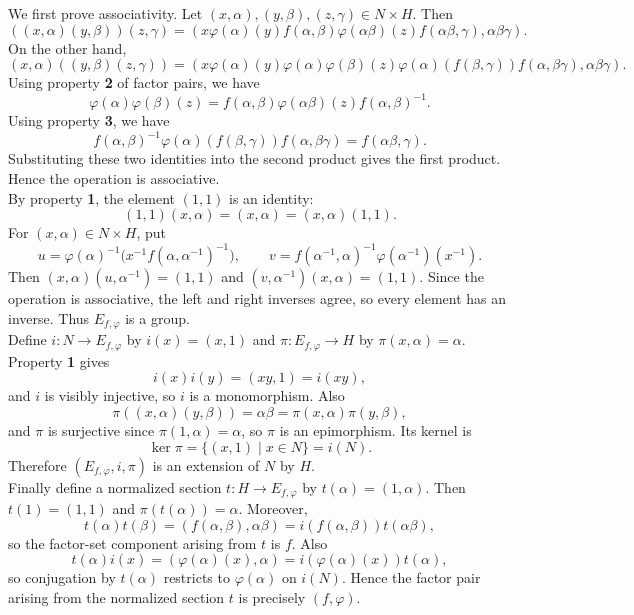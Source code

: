 \documentclass[../Odyssey_Project.tex]{subfiles}
\begin{document}
\begin{solution}
We first prove associativity. Let $(x,\alpha),(y,\beta),(z,\gamma)\in N\times H$. Then
\[
    ((x,\alpha)(y,\beta))(z,\gamma)
    =
    (x\varphi(\alpha)(y)f(\alpha,\beta)\varphi(\alpha\beta)(z)f(\alpha\beta,\gamma),\alpha\beta\gamma).
\]
On the other hand,
\[
    (x,\alpha)((y,\beta)(z,\gamma))
    =
    (x\varphi(\alpha)(y)\varphi(\alpha)\varphi(\beta)(z)\varphi(\alpha)(f(\beta,\gamma))f(\alpha,\beta\gamma),\alpha\beta\gamma).
\]
Using property \textbf{2} of factor pairs, we have
\[
    \varphi(\alpha)\varphi(\beta)(z)
    =
    f(\alpha,\beta)\varphi(\alpha\beta)(z)f(\alpha,\beta)^{-1}.
\]
Using property \textbf{3}, we have
\[
    f(\alpha,\beta)^{-1}\varphi(\alpha)(f(\beta,\gamma))f(\alpha,\beta\gamma)
    =
    f(\alpha\beta,\gamma).
\]
Substituting these two identities into the second product gives the first product. Hence the operation is associative.\\
By property \textbf{1}, the element $(1,1)$ is an identity:
\[
    (1,1)(x,\alpha)=(x,\alpha)=(x,\alpha)(1,1).
\]
For $(x,\alpha)\in N\times H$, put
\[
    u=\varphi(\alpha)^{-1}\bigl(x^{-1}f(\alpha,\alpha^{-1})^{-1}\bigr),
    \qquad
    v=f(\alpha^{-1},\alpha)^{-1}\varphi(\alpha^{-1})(x^{-1}).
\]
Then $(x,\alpha)(u,\alpha^{-1})=(1,1)$ and $(v,\alpha^{-1})(x,\alpha)=(1,1)$. Since the operation is associative, the left and right inverses agree, so every element has an inverse. Thus $E_{f,\varphi}$ is a group.\\
Define $i\colon N\to E_{f,\varphi}$ by $i(x)=(x,1)$ and $\pi\colon E_{f,\varphi}\to H$ by $\pi(x,\alpha)=\alpha$. Property \textbf{1} gives
\[
    i(x)i(y)=(xy,1)=i(xy),
\]
and $i$ is visibly injective, so $i$ is a monomorphism. Also
\[
    \pi((x,\alpha)(y,\beta))=\alpha\beta=\pi(x,\alpha)\pi(y,\beta),
\]
and $\pi$ is surjective since $\pi(1,\alpha)=\alpha$, so $\pi$ is an epimorphism. Its kernel is
\[
    \ker\pi=\{(x,1)\mid x\in N\}=i(N).
\]
Therefore $(E_{f,\varphi},i,\pi)$ is an extension of $N$ by $H$.\\
Finally define a normalized section $t\colon H\to E_{f,\varphi}$ by $t(\alpha)=(1,\alpha)$. Then $t(1)=(1,1)$ and $\pi(t(\alpha))=\alpha$. Moreover,
\[
    t(\alpha)t(\beta)=(f(\alpha,\beta),\alpha\beta)=i(f(\alpha,\beta))t(\alpha\beta),
\]
so the factor-set component arising from $t$ is $f$. Also
\[
    t(\alpha)i(x)=(\varphi(\alpha)(x),\alpha)=i(\varphi(\alpha)(x))t(\alpha),
\]
so conjugation by $t(\alpha)$ restricts to $\varphi(\alpha)$ on $i(N)$. Hence the factor pair arising from the normalized section $t$ is precisely $(f,\varphi)$.
\end{solution}
\end{document}
